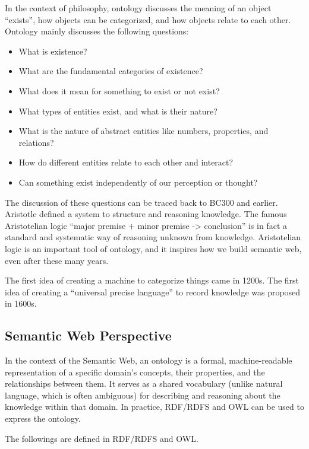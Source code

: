 In the context of philosophy, ontology discusses the meaning of an object “exists”, how objects can be categorized, and how objects relate to each other. Ontology mainly discusses the following questions:

\begin{itemize}
  \item What is existence?
  \item What are the fundamental categories of existence?
  \item What does it mean for something to exist or not exist?
  \item What types of entities exist, and what is their nature?
  \item What is the nature of abstract entities like numbers, properties, and relations?
  \item How do different entities relate to each other and interact?
  \item Can something exist independently of our perception or thought?
\end{itemize}

The discussion of these questions can be traced back to BC300 and earlier. Aristotle defined a system to structure and reasoning knowledge. The famous Aristotelian logic “major premise + minor premise -> conclusion” is in fact a standard and systematic way of reasoning unknown from knowledge. Aristotelian logic is an important tool of ontology, and it inspires how we build semantic web, even after these many years.

The first idea of creating a machine to categorize things came in 1200s. The first idea of creating a “universal precise language” to record knowledge was proposed in 1600s.

\subsection{Semantic Web Perspective}

In the context of the Semantic Web, an ontology is a formal, machine-readable representation of a specific domain's concepts, their properties, and the relationships between them. It serves as a shared vocabulary (unlike natural language, which is often ambiguous) for describing and reasoning about the knowledge within that domain. In practice, RDF/RDFS and OWL can be used to express the ontology.

The followings are defined in RDF/RDFS and OWL.

